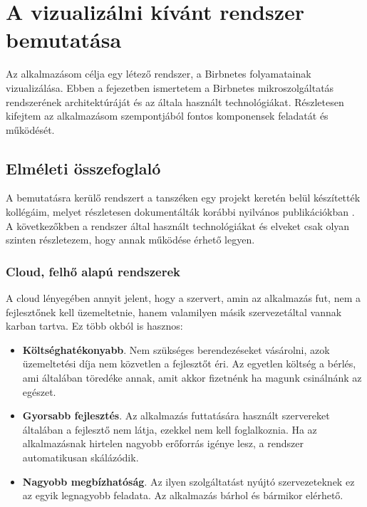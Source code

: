 \chapter{A vizualizálni kívánt rendszer bemutatása}
\label{chapt:birdnetes-introduction}
Az alkalmazásom célja egy létező rendszer, a Birbnetes folyamatainak vizualizálása.
Ebben a fejezetben ismertetem a Birbnetes mikroszolgáltatás rendszerének architektúráját és az általa használt technológiákat.
Részletesen kifejtem az alkalmazásom szempontjából fontos komponensek feladatát és működését.

\section{Elméleti összefoglaló}
A bemutatásra kerülő rendszert a tanszéken egy projekt keretén belül készítették kollégáim,
melyet részletesen dokumentálták korábbi nyilvános publikációkban \cite{birdnetes-tdk} \cite{birdnetes-thesis}.
A következőkben a rendszer által használt technológiákat és elveket csak olyan szinten részletezem,
hogy annak működése érhető legyen.

\subsection{Cloud, felhő alapú rendszerek}
A cloud lényegében annyit jelent, hogy a szervert, amin az alkalmazás fut, nem a fejlesztőnek kell üzemeltetnie,
hanem valamilyen másik szervezet\footnotemark által vannak karban tartva. 
Ez több okból is hasznos:
\begin{itemize}
    \item \textbf{Költséghatékonyabb}. Nem szükséges berendezéseket vásárolni, azok üzemeltetési díja nem közvetlen a fejlesztőt éri. Az egyetlen költség a bérlés, ami általában töredéke annak, amit akkor fizetnénk ha magunk csinálnánk az egészet.
    \item \textbf{Gyorsabb fejlesztés}. Az alkalmazás futtatására használt szervereket általában a fejlesztő nem látja, ezekkel nem kell foglalkoznia. Ha az alkalmazásnak hirtelen nagyobb erőforrás igénye lesz, a rendszer automatikusan skálázódik.
    \item \textbf{Nagyobb megbízhatóság}. Az ilyen szolgáltatást nyújtó szervezeteknek ez az egyik legnagyobb feladata. Az alkalmazás bárhol és bármikor elérhető.
\end{itemize}

